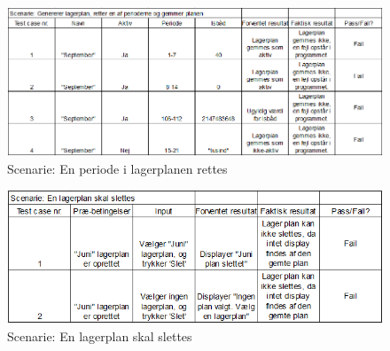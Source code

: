 \begin{figure}[tb]
    \centering
    \includegraphics[width=0.7\hsize]{figures/tests/test_ret_plan.png}
    \caption{Scenarie: En periode i lagerplanen rettes}
    \label{fig:testeditperiod}
\end{figure}

\begin{figure}[tb]
    \centering
    \includegraphics[width=0.7\hsize]{figures/tests/test_slet_lagerplan.png}
    \caption{Scenarie: En lagerplan skal slettes}
    \label{fig:testdelete}
\end{figure}